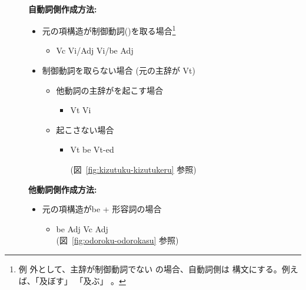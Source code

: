 \documentclass[japanese]{jnlp}
\newcommand{\eng}[1]{}
\newcommand{\coml}[1]{}
\newcommand{\comll}[1]{}
\newcommand{\comrr}[1]{}
\newcommand{\iz}[1]{}
\newcommand{\abs}{}
\newcommand{\sbj}{}
\newcommand{\obj}{}
\newcommand{\ix}{}
\newcommand{\typeSO}{}
\newcommand{\border}{}
\newcommand{\soalt}{}
\newcommand{\rto}{}
\begin{document}
{
\begin{figure}[hb]
  \begin{minipage}[t]{1.0\textwidth}
\border\\
\textbf{自動詞側作成方法:}
  \begin{itemize}
    \item 元の項構造が制御動詞(\eng{make,have,get,cause})を取る場合\footnote{例
  外として、主辞が制御動詞でない\eng{have} の場合、自動詞側は
  \eng{There is} 構文にする。例えば、「及ぼす」\eng{\abs have \obj on
    X} \rto  「及ぶ」  \eng{There be \sbj on X}。} 
        \begin{itemize}
        \item \abs Vc \obj Vi/Adj  \rto \sbj Vi/be Adj
        \iz{[synthetic]} \coml{\eng{\abs make \obj cry \rto \sbj cry}}

        \end{itemize} 

    \item 制御動詞を取らない場合 (元の主辞が Vt)
      \begin{itemize}
      \item 他動詞の主辞が\soalt を起こす場合
        \begin{itemize}
        \item \abs Vt \obj \rto \sbj Vi \iz{[\typeSO]} 
          \coml{\eng{\abs turn \obj \rto \sbj turn}}
          

        \end{itemize} 
      \item 起こさない場合
        \begin{itemize}
        \item \abs Vt \obj \rto \sbj be Vt-ed \iz{[passive]}
          \comll{(\eng{\abs injure \obj in \ix }}
            \comrr{\rto \sbj be injured in \ix )} 
            (図~\ref{fig:kizutuku-kizutukeru} 参照)
                                
       \end{itemize} 
      \end{itemize} 
    \end{itemize} 
\normalsize
\textbf{他動詞側作成方法:}  
  \begin{itemize}

  \item 元の項構造がbe + 形容詞の場合
    \begin{itemize}
    \item \sbj be Adj \rto 
    \abs Vc \obj Adj  \iz{[synthetic]} 
    \comll{(\eng{\sbj be surprised at/by \ix} }\\
     \comrr{\rto \eng{\abs (= \ix) make \obj surprised)}} 
     (図~\ref{fig:odoroku-odorokasu} 参照)
    \end{itemize}


\end{itemize}
\end{minipage}
\end{figure}}
\end{document}
